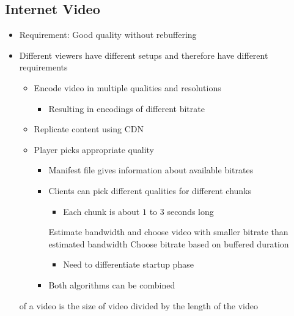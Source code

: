 \subsection{Internet Video}
\begin{itemize}
    \item Requirement: Good quality without rebuffering
    \item Different viewers have different setups and therefore have different requirements
        \begin{itemize}
            \item Encode video in multiple qualities and resolutions
                \begin{itemize}
                    \item Resulting in encodings of different bitrate
                \end{itemize}
            \item Replicate content using CDN
            \item Player picks appropriate quality
                \begin{itemize}
                    \item Manifest file gives information about available bitrates
                    \item Clients can pick different qualities for different chunks
                        \begin{itemize}
                            \item Each chunk is about $1$ to $3$ seconds long
                        \end{itemize}
                     Estimate bandwidth and choose video with smaller bitrate than estimated bandwidth
                     Choose bitrate based on buffered duration
                        \begin{itemize}
                            \item Need to differentiate startup phase
                        \end{itemize}
                    \item Both algorithms can be combined
                \end{itemize}
        \end{itemize}
     of a video is the size of video divided by the length of the video

\end{itemize}

